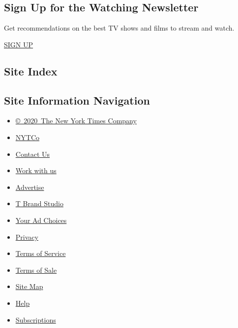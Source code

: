 \hypertarget{sign-up-for-the-watching-newsletter}{%
\subsection{Sign Up for the Watching
Newsletter}\label{sign-up-for-the-watching-newsletter}}

Get recommendations on the best TV shows and films to stream and watch.

\href{/newsletters/signup/WG}{SIGN UP}

\hypertarget{site-index}{%
\subsection{Site Index}\label{site-index}}

\hypertarget{site-information-navigation}{%
\subsection{Site Information
Navigation}\label{site-information-navigation}}

\begin{itemize}
\tightlist
\item
  \href{https://help.nytimes3xbfgragh.onion/hc/en-us/articles/115014792127-Copyright-notice}{©~2020~The
  New York Times Company}
\end{itemize}

\begin{itemize}
\tightlist
\item
  \href{https://www.nytco.com/}{NYTCo}
\item
  \href{https://help.nytimes3xbfgragh.onion/hc/en-us/articles/115015385887-Contact-Us}{Contact
  Us}
\item
  \href{https://www.nytco.com/careers/}{Work with us}
\item
  \href{https://nytmediakit.com/}{Advertise}
\item
  \href{http://www.tbrandstudio.com/}{T Brand Studio}
\item
  \href{https://www.nytimes3xbfgragh.onion/privacy/cookie-policy\#how-do-i-manage-trackers}{Your
  Ad Choices}
\item
  \href{https://www.nytimes3xbfgragh.onion/privacy}{Privacy}
\item
  \href{https://help.nytimes3xbfgragh.onion/hc/en-us/articles/115014893428-Terms-of-service}{Terms
  of Service}
\item
  \href{https://help.nytimes3xbfgragh.onion/hc/en-us/articles/115014893968-Terms-of-sale}{Terms
  of Sale}
\item
  \href{https://spiderbites.nytimes3xbfgragh.onion}{Site Map}
\item
  \href{https://help.nytimes3xbfgragh.onion/hc/en-us}{Help}
\item
  \href{https://www.nytimes3xbfgragh.onion/subscription?campaignId=37WXW}{Subscriptions}
\end{itemize}
